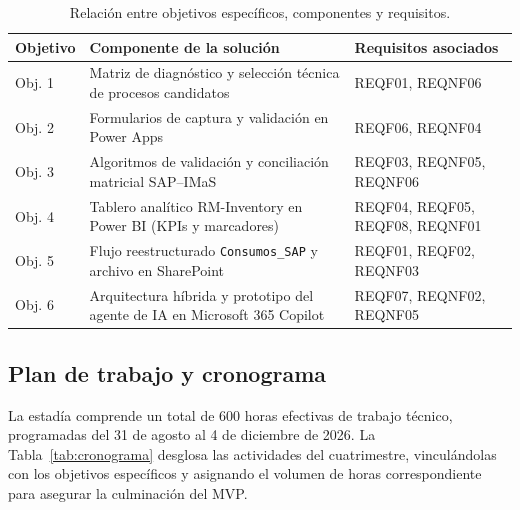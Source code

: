 \begin{table}[H]
  \centering
  \caption{Relación entre objetivos específicos, componentes y requisitos.}
  \label{tab:obj_componente}
  \begin{tabular}{@{}>{\raggedright\arraybackslash}p{2.2cm}>{\raggedright\arraybackslash}p{6.4cm}>{\raggedright\arraybackslash}p{3.4cm}@{}}
    \toprule
    \textbf{Objetivo} & \textbf{Componente de la solución} & \textbf{Requisitos asociados} \\
    \midrule
    Obj. 1 & Matriz de diagnóstico y selección técnica de procesos candidatos & REQF01, REQNF06 \\
    Obj. 2 & Formularios de captura y validación en Power Apps & REQF06, REQNF04 \\
    Obj. 3 & Algoritmos de validación y conciliación matricial SAP--IMaS & REQF03, REQNF05, REQNF06 \\
    Obj. 4 & Tablero analítico RM-Inventory en Power BI (KPIs y marcadores) & REQF04, REQF05, REQF08, REQNF01 \\
    Obj. 5 & Flujo reestructurado \texttt{Consumos\_SAP} y archivo en SharePoint & REQF01, REQF02, REQNF03 \\
    Obj. 6 & Arquitectura híbrida y prototipo del agente de IA en Microsoft 365 Copilot & REQF07, REQNF02, REQNF05 \\
    \bottomrule
  \end{tabular}
\end{table}

\subsection{Plan de trabajo y cronograma}

La estadía comprende un total de 600 horas efectivas de trabajo técnico, programadas del 31 de agosto al 4 de diciembre de 2026. La Tabla~\ref{tab:cronograma} desglosa las actividades del cuatrimestre, vinculándolas con los objetivos específicos y asignando el volumen de horas correspondiente para asegurar la culminación del MVP.

